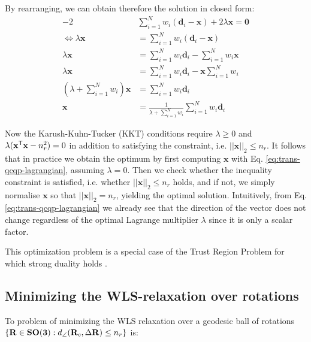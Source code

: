 By rearranging, we can obtain therefore the solution in closed form:
\begin{equation}
	\label{eq:trans-qcqp-lagrangian}
	\begin{aligned}	
		-2  &\sum_{i=1}^{N}  w_i \left(\mathbf{d}_i - \mathbf{x}\right) + 2 \lambda \mathbf{x} = \mathbf{0}\\
		\iff \lambda \mathbf{x} &= \sum_{i=1}^{N} w_i \left(\mathbf{d}_i - \mathbf{x}\right)\\
		\lambda \mathbf{x} &= \sum_{i=1}^{N}  w_i \mathbf{d}_i  - \sum_{i=1}^{N}  w_i \mathbf{x}\\
		\lambda \mathbf{x} &= \sum_{i=1}^{N}  w_i \mathbf{d}_i  - \mathbf{x} \sum_{i=1}^{N}  w_i\\
		\left( \lambda + \sum_{i=1}^{N}  w_i \right) \mathbf{x} &= \sum_{i=1}^{N} w_i \mathbf{d}_i \\
		\mathbf{x} &= \frac{1}{\lambda + \sum_{i=1}^{N}  w_i} \sum_{i=1}^{N} w_i \mathbf{d}_i 
	\end{aligned}
\end{equation}

Now the Karush-Kuhn-Tucker (KKT) conditions require $\lambda \geq 0$ and $\lambda (
\mathbf{x}^{\mathsf{T}} \mathbf{x} - n_r^2) = 0$ in addition to satisfying the constraint, i.e. $|| \mathbf{x}||_2 \leq n_r$. It follows that in practice we obtain the optimum by first computing $\mathbf{x}$ with Eq. \ref{eq:trans-qcqp-lagrangian}, assuming $\lambda = 0$. Then we check whether the inequality constraint is satisfied, i.e. whether $|| \mathbf{x}||_2 \leq n_r$ holds, and if not, we simply normalise $\mathbf{x}$ so that $|| \mathbf{x}||_2 = n_r$, yielding the optimal solution. Intuitively, from Eq. \ref{eq:trans-qcqp-lagrangian} we already see that the direction of the vector does not change regardless of the optimal Lagrange multiplier $\lambda$ since it is only a scalar factor.  

This optimization problem is a special case of the Trust Region Problem for which strong duality holds \cite[Ch. 5.2, p.229]{Boyd_Vandenberghe_2004}.

\subsection{Minimizing the WLS-relaxation over rotations}

To problem of minimizing the WLS relaxation over a geodesic ball of rotations $\{\mathbf{R} \in \mathbf{SO(3)}:  d_{\angle}(\mathbf{R}_c, \Delta\mathbf{R}) \leq n_r\}$ is:

